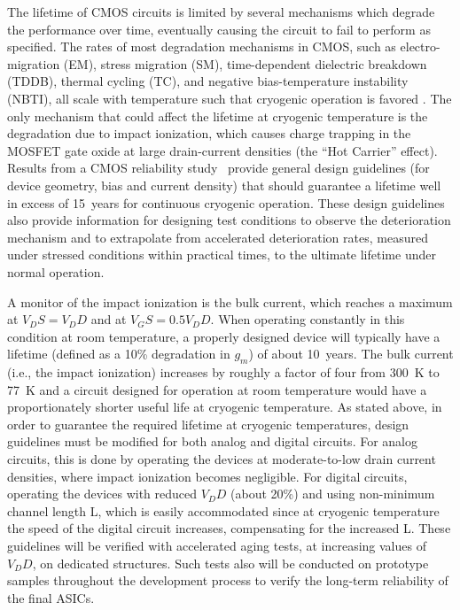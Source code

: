 The lifetime of CMOS circuits is limited by several mechanisms which degrade 
the performance over time, eventually causing the circuit to fail to perform as specified. 
The rates of most degradation mechanisms in CMOS, such as electro-migration (EM), 
stress migration (SM), time-dependent dielectric breakdown (TDDB), thermal cycling (TC), 
and negative bias-temperature instability (NBTI), all scale with temperature such that 
cryogenic operation is favored \cite{CMOS-lifetime}\cite{PMOS-model}. The only mechanism 
that could affect the lifetime at cryogenic temperature is the degradation due to 
impact ionization, which causes charge trapping in the MOSFET gate oxide at 
large drain-current densities (the ``Hot Carrier'' effect). Results from a CMOS reliability study~\cite{CMOS-reliability} 
provide general design guidelines (for device geometry, bias and current density) 
that should guarantee a lifetime well in excess of 15~years for continuous cryogenic operation. 
These design guidelines also provide information for designing test conditions to observe the 
deterioration mechanism and to extrapolate from accelerated deterioration rates, 
measured under stressed conditions within practical times, to the ultimate lifetime under normal operation.

A monitor of the impact ionization is the bulk current, which reaches a maximum at $V_DS = V_DD$ and at $V_GS = 0.5 V_DD$. 
When operating constantly in this condition at room temperature, a properly designed device 
will typically have a lifetime (defined as a 10\% degradation in $g_m$) of about 10~years. 
The bulk current (i.e., the impact ionization) increases by roughly a factor of four from 300~K to 77~K 
\cite{CMOS-reliability} and a circuit designed for operation at room temperature would have 
a proportionately shorter useful life at cryogenic temperature. As stated above, in order to guarantee 
the required lifetime at cryogenic temperatures, design guidelines must be modified for both analog 
and digital circuits. For analog circuits, this is done by operating the devices at moderate-to-low 
drain current densities, where impact ionization becomes negligible. For digital circuits, 
operating the devices with reduced $V_DD$ (about 20\%) and using non-minimum channel length L, 
which is easily accommodated since at cryogenic temperature the speed of the digital circuit increases, 
compensating for the increased L. These guidelines will be verified with accelerated aging tests, 
at increasing values of $V_DD$, on dedicated structures. Such tests also will be conducted on 
prototype samples throughout the development process to verify the long-term reliability of the final ASICs.

